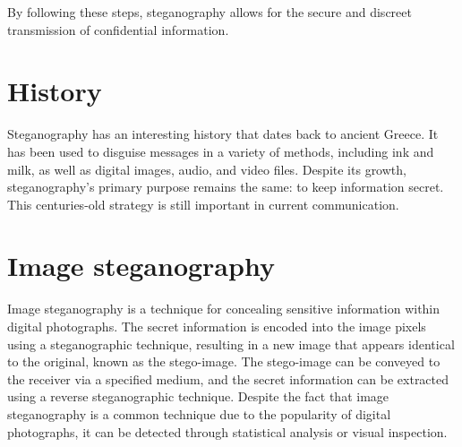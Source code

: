 By following these steps, steganography allows for the secure and discreet transmission of confidential information.
\section{History}
Steganography has an interesting history that dates back to ancient Greece. It has been used to disguise messages in a variety of methods, including ink and milk, as well as digital images, audio, and video files. Despite its growth, steganography's primary purpose remains the same: to keep information secret. This centuries-old strategy is still important in current communication.

\section{Image steganography}
Image steganography is a technique for concealing sensitive information within digital photographs. The secret information is encoded into the image pixels using a steganographic technique, resulting in a new image that appears identical to the original, known as the stego-image. The stego-image can be conveyed to the receiver via a specified medium, and the secret information can be extracted using a reverse steganographic technique. Despite the fact that image steganography is a common technique due to the popularity of digital photographs, it can be detected through statistical analysis or visual inspection.

